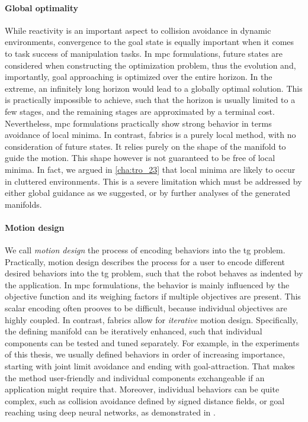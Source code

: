 \paragraph{Global optimality}
\label{par:discussion_global_optimiality}

While reactivity is an important aspect to collision
avoidance in dynamic environments, convergence to the goal
state is equally important when it comes to task success of
manipulation tasks. In \ac{mpc} formulations, future states
are considered when constructing the optimization problem,
thus the evolution and, importantly, goal approaching is
optimized over the entire horizon. In the extreme, an
infinitely long horizon would lead to a globally optimal
solution. This is practically impossible to achieve, such
that the horizon is usually limited to a few stages, and the
remaining stages are approximated by a terminal cost.
Nevertheless, \ac{mpc} formulations practically show strong 
behavior in terms avoidance of local minima. In contrast,
\ac{fabrics} is a purely local method, with no consideration
of future states. It relies purely on the shape of the
manifold to guide the motion. This shape however is not
guaranteed to be free of local minima. In fact, we argued in 
\cref{cha:tro_23} that local minima are likely to occur in
cluttered environments. This is a severe limitation which
must be addressed by either global guidance as we suggested,
or by further analyses of the generated manifolds.

\paragraph{Motion design}
\label{par:motion_design}

We call \textit{motion design} the process of encoding
behaviors into the \ac{tg} problem. Practically, motion
design describes the 
process for a user to encode different desired behaviors
into the \ac{tg} problem, such that the robot behaves as
indented by the application. In \ac{mpc} formulations,
the behavior is mainly influenced by the objective function
and its weighing factors if multiple objectives are present.
This scalar encoding often prooves to be difficult, because
individual objectives are highly coupled. In contrast,
\ac{fabrics} allow for \textit{iterative} motion design.
Specifically, the defining manifold can be iteratively
enhanced, such that individual components can be tested and
tuned separately. For example, in the experiments of this
thesis, we usually defined behaviors in order of
increasing importance, starting with joint limit avoidance
and ending with goal-attraction. That makes the method
user-friendly and individual components exchangeable if an
application might require that. Moreover, individual
behaviors can be quite complex, such as collision avoidance
defined by signed distance fields, or goal reaching using
deep neural networks, as demonstrated in \cite{xie2023neural}.

